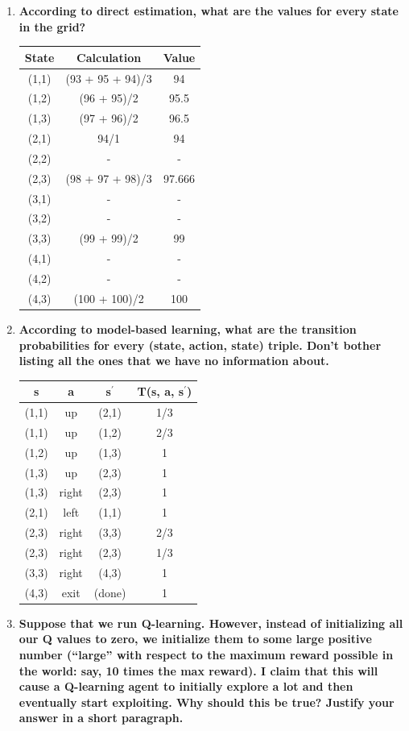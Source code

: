\documentclass[fleqn]{hw}
\begin{document}
\begin{enumerate}
    \item {\bf According to direct estimation, what are the values for every state in the grid?}

\begin{center}
\begin{tabular}{c|c|c}
    {\bf State} & {\bf Calculation} & {\bf Value} \\
\hline
    (1,1) & (93 + 95 + 94)/3 & 94 \\
    (1,2) & (96 + 95)/2&95.5 \\
    (1,3) & (97 + 96)/2&96.5 \\
    (2,1) & 94/1&94 \\
    (2,2) & -&- \\
    (2,3) & (98 + 97 + 98)/3&97.666 \\
    (3,1) & -&- \\
    (3,2) & -&- \\
    (3,3) & (99 + 99)/2&99 \\
    (4,1) & -&- \\
    (4,2) & -&- \\
    (4,3) & (100 + 100)/2&100 \\
\end{tabular}
\end{center}

    \item {\bf According to model-based learning, what are the transition
probabilities for every (state, action, state) triple.  Don't bother
        listing all the ones that we have no information about. }

\begin{center}
\begin{tabular}{c|c|c|c}
{\bf s} & {\bf a} & {\bf s$^\prime$} & {\bf T(s, a, s$^\prime$)} \\
\hline
(1,1) & up & (2,1) & 1/3\\
(1,1) & up & (1,2) & 2/3\\
(1,2) & up & (1,3) & 1\\
(1,3) & up & (2,3) & 1\\
(1,3) & right & (2,3) & 1\\
(2,1) & left & (1,1) & 1\\
(2,3) & right & (3,3) & 2/3\\
(2,3) & right & (2,3) & 1/3\\
(3,3) & right & (4,3) & 1\\
(4,3) & exit & (done) & 1\\
\end{tabular}
\end{center}

\item {\bf Suppose that we run Q-learning.  However, instead of initializing all
our Q values to zero, we initialize them to some large positive number
(``large'' with respect to the maximum reward possible in the world:
say, 10 times the max reward).  I claim that this will cause a
Q-learning agent to initially explore a lot and then eventually start
exploiting.  Why should this be true?  Justify your answer in a short
        paragraph.}
\end{enumerate}
\end{document}
